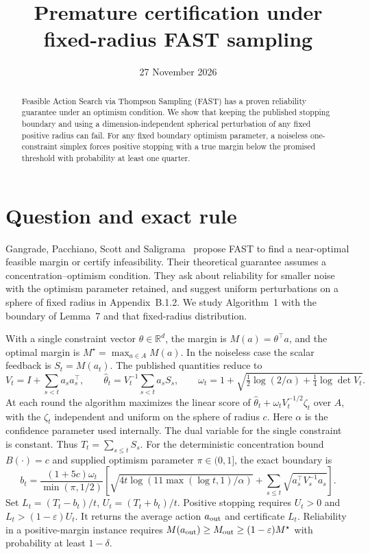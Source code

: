\documentclass[11pt]{amsart}
\title{Premature certification under fixed-radius FAST sampling}
\date{27 November 2026}
\begin{document}
\begin{abstract}
Feasible Action Search via Thompson Sampling (FAST) has a proven reliability guarantee under an optimism condition. We show that keeping the published stopping boundary and using a dimension-independent spherical perturbation of any fixed positive radius can fail. For any fixed boundary optimism parameter, a noiseless one-constraint simplex forces positive stopping with a true margin below the promised threshold with probability at least one quarter.
\end{abstract}
\maketitle

\section{Question and exact rule}
Gangrade, Pacchiano, Scott and Saligrama~\cite{GPSS} propose FAST to find a near-optimal feasible margin or certify infeasibility. Their theoretical guarantee assumes a concentration--optimism condition. They ask about reliability for smaller noise with the optimism parameter retained, and suggest uniform perturbations on a sphere of fixed radius in Appendix~B.1.2. We study Algorithm~1 with the boundary of Lemma~7 and that fixed-radius distribution.

With a single constraint vector \(\theta\in\mathbb R^d\), the margin is \(M(a)=\theta^\top a\), and the optimal margin is \(M^\star=\max_{a\in A}M(a)\). In the noiseless case the scalar feedback is \(S_t=M(a_t)\). The published quantities reduce to
\[
 V_t=I+\sum_{s<t}a_sa_s^\top,\qquad
 \widehat\theta_t=V_t^{-1}\sum_{s<t}a_s S_s,\qquad
 \omega_t=1+\sqrt{\tfrac12\log(2/\alpha)+\tfrac14\log\det V_t}.
\]
At each round the algorithm maximizes the linear score of
\(\widehat\theta_t+\omega_t V_t^{-1/2}\zeta_t\) over \(A\), with the \(\zeta_t\) independent and uniform on the sphere of radius \(c\). Here \(\alpha\) is the confidence parameter used internally. The dual variable for the single constraint is constant. Thus \(T_t=\sum_{s\le t}S_s\). For the deterministic concentration bound \(B(\cdot)=c\) and supplied optimism parameter \(\pi\in(0,1]\), the exact boundary is
\[
 b_t=\frac{(1+5c)\omega_t}{\min(\pi,1/2)}
       \left[\sqrt{4t\log(11\max(\log t,1)/\alpha)}
                 +\sum_{s\le t}\sqrt{a_s^\top V_s^{-1}a_s}\right].
\]
Set \(L_t=(T_t-b_t)/t\), \(U_t=(T_t+b_t)/t\). Positive stopping requires \(U_t>0\) and \(L_t>(1-\varepsilon)U_t\). It returns the average action \(a_{\rm out}\) and certificate \(L_t\). Reliability in a positive-margin instance requires \(M(a_{\rm out})\ge M_{\rm out}\ge(1-\varepsilon)M^\star\) with probability at least \(1-\delta\).
\end{document}
